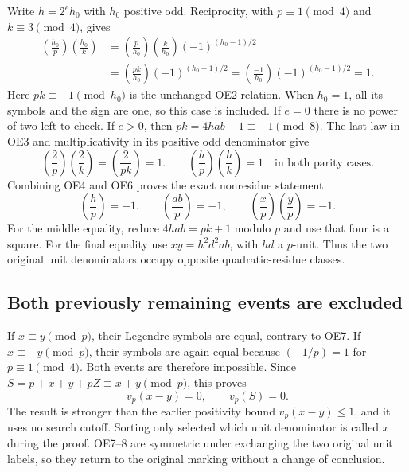 \documentclass[11pt]{article}
\begin{document}
Write $h=2^e h_0$ with $h_0$ positive odd. Reciprocity, with
$p\equiv1\pmod4$ and $k\equiv3\pmod4$, gives
\begin{align}
 \left(\frac{h_0}{p}\right)\left(\frac{h_0}{k}\right)
 &=\left(\frac p{h_0}\right)\left(\frac k{h_0}\right)
       (-1)^{(h_0-1)/2} \nonumber\\
 &=\left(\frac{pk}{h_0}\right)(-1)^{(h_0-1)/2}
  =\left(\frac{-1}{h_0}\right)(-1)^{(h_0-1)/2}=1.
                                                               \tag{OE5}
\end{align}
Here $pk\equiv-1\pmod{h_0}$ is the unchanged OE2 relation.
When $h_0=1$, all its symbols and the sign are one, so this case
is included. If $e=0$ there is no power of two left to check.
If $e>0$, then $pk=4hab-1\equiv-1\pmod8$. The last law in OE3
and multiplicativity in its positive odd denominator give
\begin{equation}
 \left(\frac2p\right)\left(\frac2k\right)
     =\left(\frac2{pk}\right)=1.
 \qquad
 \left(\frac hp\right)\left(\frac hk\right)=1
 \quad\text{in both parity cases}.                     \tag{OE6}
\end{equation}
Combining OE4 and OE6 proves the exact nonresidue statement
\begin{equation}
 \boxed{\left(\frac hp\right)=-1.}\qquad
 \left(\frac{ab}{p}\right)=-1,
 \qquad \boxed{\left(\frac xp\right)
                       \left(\frac yp\right)=-1.}      \tag{OE7}
\end{equation}
For the middle equality, reduce $4hab=pk+1$ modulo $p$ and use
that four is a square. For the final equality use
$xy=h^2d^2ab$, with $hd$ a $p$-unit. Thus the two original unit
denominators occupy opposite quadratic-residue classes.

\subsection{Both previously remaining events are excluded}
If $x\equiv y\pmod p$, their Legendre symbols are equal, contrary
to OE7. If $x\equiv-y\pmod p$, their symbols are again equal
because $(-1/p)=1$ for $p\equiv1\pmod4$. Both events are therefore
impossible. Since $S=p+x+y+pZ\equiv x+y\pmod p$, this proves
\begin{equation}
 \boxed{v_p(x-y)=0,\qquad v_p(S)=0.}                    \tag{OE8}
\end{equation}
The result is stronger than the earlier positivity bound
$v_p(x-y)\le1$, and it uses no search cutoff. Sorting only selected
which unit denominator is called $x$ during the proof. OE7--8 are
symmetric under exchanging the two original unit labels, so they
return to the original marking without a change of conclusion.
\end{document}
